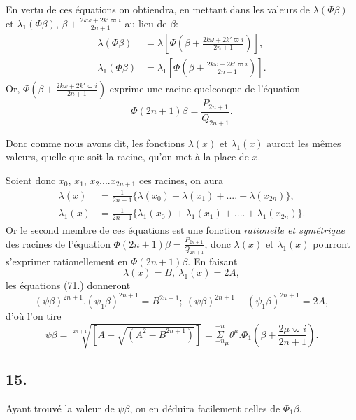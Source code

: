 \documentclass{article}
\begin{document}
En vertu de ces équations on obtiendra, en mettant dans les valeurs de $\lambda(\Phi\beta)$ et $\lambda_{1}(\Phi\beta)$, $\beta+\frac{2k\omega+2k'\varpi i}{2n+1}$ au lieu de $\beta$:
\[ \begin{aligned}
\lambda(\Phi\beta)&=\lambda\left[\Phi\left(\beta+\frac{2k\omega+2k'\varpi i}{2n+1}\right)\right],\\
\lambda_{1}(\Phi\beta)&=\lambda_{1}\left[\Phi\left(\beta+\frac{2k\omega+2k'\varpi i}{2n+1}\right)\right].
\end{aligned} \]
Or, $\Phi\left(\beta+\frac{2k\omega+2k'\varpi i}{2n+1}\right)$ exprime une racine quelconque de l'équation
\[ \Phi(2n+1)\beta=\frac{P_{2n+1}}{Q_{2n+1}}. \]

Donc comme nous avons dit, les fonctions $\lambda(x)$ et $\lambda_{1}(x)$ auront les mêmes valeurs, quelle que soit la racine, qu'on met à la place de $x$.

Soient donc $x_{0}$, $x_{1}$, $x_{2}....x_{2n+1}$ ces racines, on aura
\[ \begin{aligned}
\lambda(x)&=\frac{1}{2n+1}\{\lambda(x_{0})+\lambda(x_{1})+....+\lambda(x_{2n})\},\\
\lambda_{1}(x)&=\frac{1}{2n+1}\{\lambda_{1}(x_{0})+\lambda_{1}(x_{1})+....+\lambda_{1}(x_{2n})\}.
\end{aligned} \]
Or le second membre de ces équations est une fonction \emph{rationelle et symétrique} des racines de l'équation $\Phi(2n+1)\beta=\frac{P_{2n+1}}{Q_{2n+1}}$, donc $\lambda(x)$ et $\lambda_{1}(x)$ pourront s'exprimer rationellement en $\Phi(2n+1)\beta$. En faisant
\[ \lambda(x)=B,\ \lambda_{1}(x)=2A, \]
les équations (71.) donneront
\[ (\psi\beta)^{2n+1}.(\psi_{1}\beta)^{2n+1}=B^{2n+1};\ (\psi\beta)^{2n+1}+(\psi_{1}\beta)^{2n+1}=2A, \]
d'où l'on tire
\[ \psi\beta=\sqrt[2n+1]{[A+\sqrt{(A^{2}-B^{2n+1})}]}=\overset{+n}{\underset{-n}{\Sigma}}_{\mu}\theta^{\mu}.\Phi_{1}\left(\beta+\frac{2\mu\varpi i}{2n+1}\right). \tag{75.} \]

\subsection*{15.}

Ayant trouvé la valeur de $\psi\beta$, on en déduira facilement celles de $\Phi_{1}\beta$.
\end{document}
